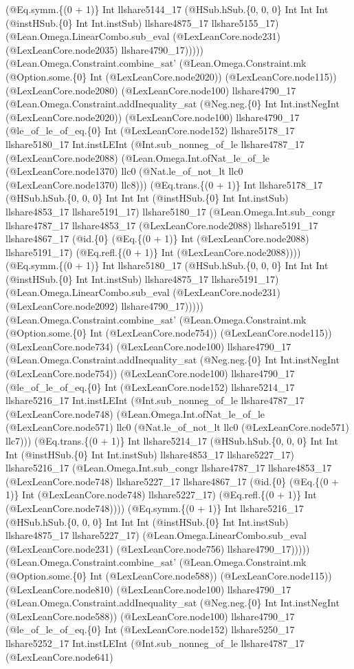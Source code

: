 \documentclass[11pt]{article}
\begin{document}
(@Eq.symm.\{(0 + 1)\} Int llshare5144\_17 (@HSub.hSub.\{0, 0, 0\} Int Int Int (@instHSub.\{0\} Int Int.instSub) llshare4875\_17 llshare5155\_17) (@Lean.Omega.LinearCombo.sub\_eval (@LexLeanCore.node231) (@LexLeanCore.node2035) llshare4790\_17))))) (@Lean.Omega.Constraint.combine\_sat' (@Lean.Omega.Constraint.mk (@Option.some.\{0\} Int (@LexLeanCore.node2020)) (@LexLeanCore.node115)) (@LexLeanCore.node2080) (@LexLeanCore.node100) llshare4790\_17 (@Lean.Omega.Constraint.addInequality\_sat (@Neg.neg.\{0\} Int Int.instNegInt (@LexLeanCore.node2020)) (@LexLeanCore.node100) llshare4790\_17 (@le\_of\_le\_of\_eq.\{0\} Int (@LexLeanCore.node152) llshare5178\_17 llshare5180\_17 Int.instLEInt (@Int.sub\_nonneg\_of\_le llshare4787\_17 (@LexLeanCore.node2088) (@Lean.Omega.Int.ofNat\_le\_of\_le (@LexLeanCore.node1370) llc0 (@Nat.le\_of\_not\_lt llc0 (@LexLeanCore.node1370) llc8))) (@Eq.trans.\{(0 + 1)\} Int llshare5178\_17 (@HSub.hSub.\{0, 0, 0\} Int Int Int (@instHSub.\{0\} Int Int.instSub) llshare4853\_17 llshare5191\_17) llshare5180\_17 (@Lean.Omega.Int.sub\_congr llshare4787\_17 llshare4853\_17 (@LexLeanCore.node2088) llshare5191\_17 llshare4867\_17 (@id.\{0\} (@Eq.\{(0 + 1)\} Int (@LexLeanCore.node2088) llshare5191\_17) (@Eq.refl.\{(0 + 1)\} Int (@LexLeanCore.node2088)))) (@Eq.symm.\{(0 + 1)\} Int llshare5180\_17 (@HSub.hSub.\{0, 0, 0\} Int Int Int (@instHSub.\{0\} Int Int.instSub) llshare4875\_17 llshare5191\_17) (@Lean.Omega.LinearCombo.sub\_eval (@LexLeanCore.node231) (@LexLeanCore.node2092) llshare4790\_17))))) (@Lean.Omega.Constraint.combine\_sat' (@Lean.Omega.Constraint.mk (@Option.some.\{0\} Int (@LexLeanCore.node754)) (@LexLeanCore.node115)) (@LexLeanCore.node734) (@LexLeanCore.node100) llshare4790\_17 (@Lean.Omega.Constraint.addInequality\_sat (@Neg.neg.\{0\} Int Int.instNegInt (@LexLeanCore.node754)) (@LexLeanCore.node100) llshare4790\_17 (@le\_of\_le\_of\_eq.\{0\} Int (@LexLeanCore.node152) llshare5214\_17 llshare5216\_17 Int.instLEInt (@Int.sub\_nonneg\_of\_le llshare4787\_17 (@LexLeanCore.node748) (@Lean.Omega.Int.ofNat\_le\_of\_le (@LexLeanCore.node571) llc0 (@Nat.le\_of\_not\_lt llc0 (@LexLeanCore.node571) llc7))) (@Eq.trans.\{(0 + 1)\} Int llshare5214\_17 (@HSub.hSub.\{0, 0, 0\} Int Int Int (@instHSub.\{0\} Int Int.instSub) llshare4853\_17 llshare5227\_17) llshare5216\_17 (@Lean.Omega.Int.sub\_congr llshare4787\_17 llshare4853\_17 (@LexLeanCore.node748) llshare5227\_17 llshare4867\_17 (@id.\{0\} (@Eq.\{(0 + 1)\} Int (@LexLeanCore.node748) llshare5227\_17) (@Eq.refl.\{(0 + 1)\} Int (@LexLeanCore.node748)))) (@Eq.symm.\{(0 + 1)\} Int llshare5216\_17 (@HSub.hSub.\{0, 0, 0\} Int Int Int (@instHSub.\{0\} Int Int.instSub) llshare4875\_17 llshare5227\_17) (@Lean.Omega.LinearCombo.sub\_eval (@LexLeanCore.node231) (@LexLeanCore.node756) llshare4790\_17))))) (@Lean.Omega.Constraint.combine\_sat' (@Lean.Omega.Constraint.mk (@Option.some.\{0\} Int (@LexLeanCore.node588)) (@LexLeanCore.node115)) (@LexLeanCore.node810) (@LexLeanCore.node100) llshare4790\_17 (@Lean.Omega.Constraint.addInequality\_sat (@Neg.neg.\{0\} Int Int.instNegInt (@LexLeanCore.node588)) (@LexLeanCore.node100) llshare4790\_17 (@le\_of\_le\_of\_eq.\{0\} Int (@LexLeanCore.node152) llshare5250\_17 llshare5252\_17 Int.instLEInt (@Int.sub\_nonneg\_of\_le llshare4787\_17 (@LexLeanCore.node641) 
\end{document}
